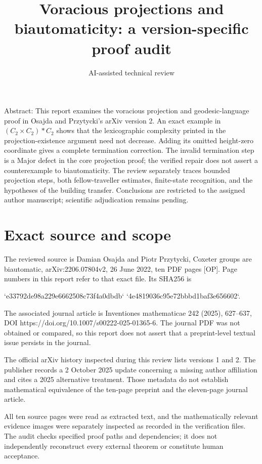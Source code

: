\documentclass[10pt]{article}
\title{Voracious projections and biautomaticity:
a version-specific proof audit}
\author{AI-assisted technical review}
\date{}
\begin{document}
\maketitle
Abstract: This report examines the voracious projection and geodesic-language proof in Osajda and Przytycki’s arXiv version 2. An exact example in \((C_2\times C_2)*C_2\) shows that the lexicographic complexity printed in the projection-existence argument need not decrease. Adding its omitted height-zero coordinate gives a complete termination correction. The invalid termination step is a Major defect in the core projection proof; the verified repair does not assert a counterexample to biautomaticity. The review separately traces bounded projection steps, both fellow-traveller estimates, finite-state recognition, and the hypotheses of the building transfer. Conclusions are restricted to the assigned author manuscript; scientific adjudication remains pending.\par
\section*{Exact source and scope}
The reviewed source is Damian Osajda and Piotr Przytycki, Coxeter groups are biautomatic, arXiv:2206.07804v2, 26 June 2022, ten PDF pages [OP]. Page numbers in this report refer to that exact file. Its SHA256 is\par
`e33792de98a229e6662508c73f4a0dbdb`
`4e4819036c95e72bbbd1baf3e656602`.\par
The associated journal article is Inventiones mathematicae 242 (2025), 627–637, DOI https://doi.org/10.1007/s00222-025-01365-6. The journal PDF was not obtained or compared, so this report does not assert that a preprint-level textual issue persists in the journal.\par
The official arXiv history inspected during this review lists versions 1 and 2. The publisher records a 2 October 2025 update concerning a missing author affiliation and cites a 2025 alternative treatment. Those metadata do not establish mathematical equivalence of the ten-page preprint and the eleven-page journal article.\par
All ten source pages were read as extracted text, and the mathematically relevant evidence images were separately inspected as recorded in the verification files. The audit checks specified proof paths and dependencies; it does not independently reconstruct every external theorem or constitute human acceptance.\par
\end{document}
